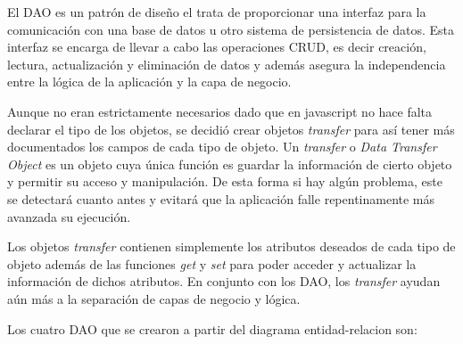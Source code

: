 \documentclass[11pt]{article}
\begin{document}
El DAO es un patrón de diseño el trata de proporcionar una interfaz para la comunicación con una base de datos u otro sistema de persistencia de datos. Esta interfaz se encarga de llevar a cabo las operaciones CRUD, es decir creación, lectura, actualización y eliminación de datos y además asegura la independencia entre la lógica de la aplicación y la capa de negocio.

Aunque no eran estrictamente necesarios dado que en javascript no hace falta declarar el tipo de los objetos, se decidió crear objetos \emph{transfer} para así tener más documentados los campos de cada tipo de objeto.
Un \emph{transfer} o \emph{Data Transfer Object} es un objeto cuya única función es guardar la información de cierto objeto y permitir su acceso y manipulación.
De esta forma si hay algún problema, este se detectará cuanto antes y evitará que la aplicación falle repentinamente más avanzada su ejecución.

Los objetos \emph{transfer} contienen simplemente los atributos deseados de cada tipo de objeto además de las funciones \emph{get} y \emph{set} para poder acceder y actualizar la información de dichos atributos.
En conjunto con los DAO, los \emph{transfer} ayudan aún más a la separación de capas de negocio y lógica.

Los cuatro DAO que se crearon a partir del diagrama entidad-relacion son:
\end{document}
